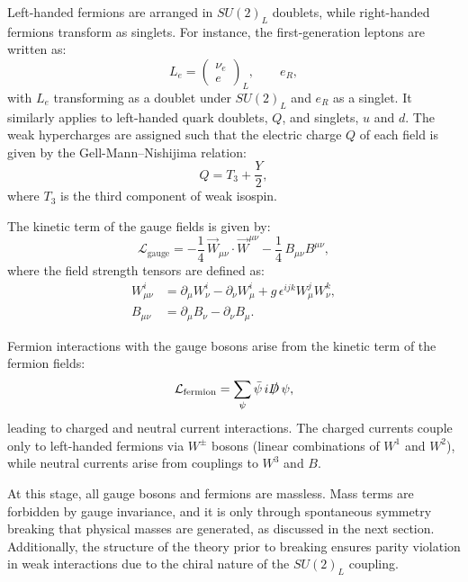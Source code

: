 Left-handed fermions are arranged in $SU(2)_L$ doublets, while right-handed fermions transform as singlets. For instance, the first-generation leptons are written as:
\begin{equation}
L_e =
\begin{pmatrix}
\nu_e \\
e
\end{pmatrix}_L, \qquad e_R,
\end{equation}
with $L_e$ transforming as a doublet under $SU(2)_L$ and $e_R$ as a singlet. It similarly applies to left-handed quark doublets, $Q$, and singlets, $u$ and $d$. The weak hypercharges are assigned such that the electric charge $Q$ of each field is given by the Gell-Mann–Nishijima relation:
\begin{equation}
Q = T_3 + \frac{Y}{2},
\end{equation}
where $T_3$ is the third component of weak isospin.

The kinetic term of the gauge fields is given by:
\begin{equation}
\mathcal{L}_{\text{gauge}} = -\frac{1}{4} \, \vec{W}_{\mu\nu} \cdot \vec{W}^{\mu\nu} - \frac{1}{4} \, B_{\mu\nu} B^{\mu\nu},
\end{equation}
where the field strength tensors are defined as:
\begin{align}
W_{\mu\nu}^i &= \partial_\mu W_\nu^i - \partial_\nu W_\mu^i + g \, \epsilon^{ijk} W_\mu^j W_\nu^k, \\
B_{\mu\nu} &= \partial_\mu B_\nu - \partial_\nu B_\mu.
\end{align}

Fermion interactions with the gauge bosons arise from the kinetic term of the fermion fields:
\begin{equation}
\mathcal{L}_{\text{fermion}} = \sum_{\psi} \bar{\psi} \, i \slashed{D} \, \psi,
\end{equation}
leading to charged and neutral current interactions. The charged currents couple only to left-handed fermions via $W^\pm$ bosons (linear combinations of $W^1$ and $W^2$), while neutral currents arise from couplings to $W^3$ and $B$.

At this stage, all gauge bosons and fermions are massless. Mass terms are forbidden by gauge invariance, and it is only through spontaneous symmetry breaking that physical masses are generated, as discussed in the next section. Additionally, the structure of the theory prior to breaking ensures parity violation in weak interactions due to the chiral nature of the $SU(2)_L$ coupling.

